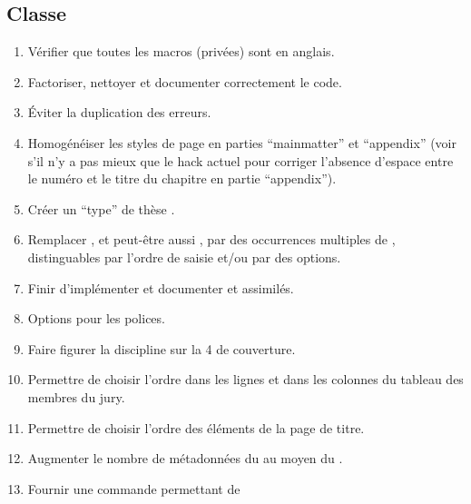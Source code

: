 \subsection{Classe}
\label{sec:classe-ult}

\begin{enumerate}
\item Vérifier que toutes les macros (privées) sont en anglais.
\item Factoriser, nettoyer et documenter correctement le code.
\item Éviter la duplication des erreurs.
\item Homogénéiser les styles de page en parties \enquote{mainmatter} et
  \enquote{appendix} (voir s'il n'y a pas mieux que le hack actuel pour
  corriger l'absence d'espace entre le numéro et le titre du chapitre en partie
  \enquote{appendix}).
\item Créer un \enquote{type} de thèse .
\item Remplacer , et peut-être aussi , par des
  occurrences multiples de , distinguables par l'ordre de saisie
  et/ou par des  options.
\item Finir d'implémenter et documenter  et
  assimilés.
\item Options pour les polices.
\item Faire figurer la discipline sur la 4\ieme{} de couverture.
\item Permettre de choisir l'ordre dans les lignes et dans les colonnes du
  tableau des membres du jury.
\item Permettre de choisir l'ordre des éléments de la page de titre.
\item Augmenter le nombre de métadonnées du  au moyen du
  .
\item Fournir une commande  permettant de

\end{enumerate}
